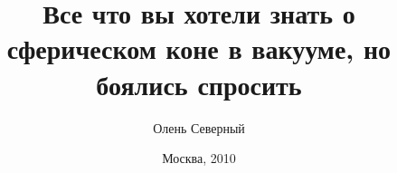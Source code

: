 \documentclass{beamer}
\begin{document}
\title{Все что вы хотели знать о сферическом коне в вакууме, но боялись спросить}  
\author{Олень Северный}
\date{Москва, 2010} 

\frame{\titlepage} 

\end{document}
